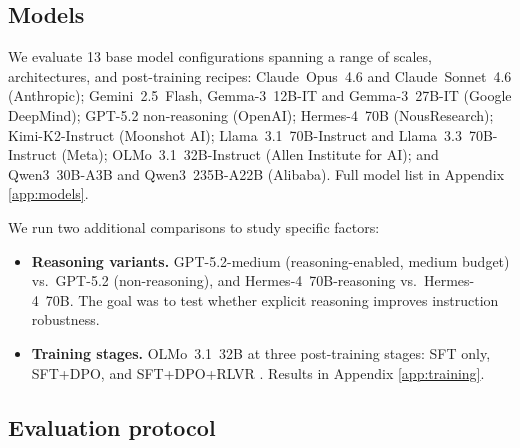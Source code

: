 \subsection{Models}
\label{sec:models}

We evaluate 13 base model configurations spanning a range of scales, architectures, and post-training recipes:
Claude~Opus~4.6 and Claude~Sonnet~4.6 (Anthropic);
Gemini~2.5~Flash, Gemma-3~12B-IT and Gemma-3~27B-IT  (Google DeepMind);
GPT-5.2 non-reasoning (OpenAI);
Hermes-4~70B (NousResearch);
Kimi-K2-Instruct (Moonshot AI);
Llama~3.1~70B-Instruct and Llama~3.3~70B-Instruct (Meta);
OLMo~3.1~32B-Instruct (Allen Institute for AI);
and Qwen3~30B-A3B and Qwen3~235B-A22B (Alibaba). Full model list in Appendix \ref{app:models}.

We run two additional comparisons to study specific factors:
\begin{itemize}[nosep,topsep=2pt]
  \item \textbf{Reasoning variants.} GPT-5.2-medium (reasoning-enabled, medium budget) vs.\ GPT-5.2 (non-reasoning), and Hermes-4~70B-reasoning vs.\ Hermes-4~70B. The goal was to test whether explicit reasoning improves instruction robustness.
  \item \textbf{Training stages.} OLMo~3.1~32B at three post-training stages: SFT only, SFT+DPO, and SFT+DPO+RLVR \citep{olmo_olmo_2025}. Results in Appendix \ref{app:training}.
\end{itemize}




\subsection{Evaluation protocol}
\label{sec:eval}

